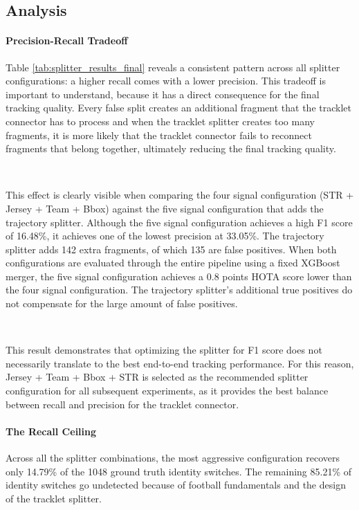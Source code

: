 \subsection{Analysis}
\paragraph{Precision-Recall Tradeoff}
Table \ref{tab:splitter_results_final} reveals a consistent pattern across all splitter configurations: a higher recall comes with a lower precision. This tradeoff is important to understand, because it has a direct consequence for the final tracking quality. Every false split creates an additional fragment that the tracklet connector has to process and when the tracklet splitter creates too many fragments, it is more likely that the tracklet connector fails to reconnect fragments that belong together, ultimately reducing the final tracking quality. 

\

This effect  is clearly visible when comparing the four signal configuration (STR + Jersey + Team + Bbox) against the five signal configuration that adds the trajectory splitter. Although the five signal configuration achieves a high F1 score of 16.48\%, it achieves one of the lowest precision at 33.05\%. The trajectory splitter adds 142 extra fragments, of which 135 are false positives. When both configurations are evaluated through the entire pipeline using a fixed XGBoost merger, the five signal configuration achieves a 0.8 points HOTA score lower than the four signal  configuration. The trajectory splitter's additional true positives do not compensate for the large amount of false positives.

\

This result demonstrates that optimizing the splitter for F1 score does not necessarily translate to the best end-to-end tracking performance. For this reason, Jersey + Team + Bbox + STR is selected as the recommended splitter configuration for all subsequent experiments, as it provides the best balance between recall and precision for the tracklet connector.


\paragraph{The Recall Ceiling}
Across all the splitter combinations, the most aggressive configuration recovers only 14.79\% of the 1048 ground truth identity switches. The remaining 85.21\% of identity switches go undetected because of football fundamentals and the design of the tracklet splitter.

